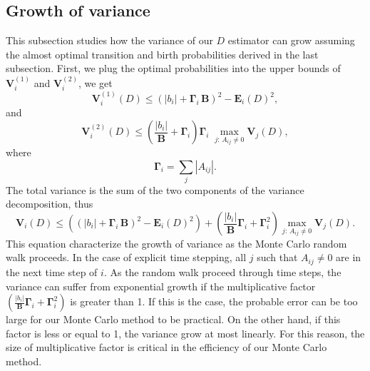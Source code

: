 \documentclass[a4paper,11pt]{article}
\theoremstyle{remark}
\theoremstyle{definition}
\begin{document}
    \subsection{Growth of variance}
        This subsection studies how the variance of our $D$ estimator can
        grow assuming the almost optimal transition and birth probabilities
        derived in the last subsection.  First, we plug the optimal
        probabilities into the upper bounds of $\mathbf{V}_i^{(1)}$ and
        $\mathbf{V}_i^{(2)}$, we get
        \[ \mathbf{V}_i^{(1)}(D)
            \le \left(|b_i| + \mathbf{\Gamma}_i\, \mathbf{B} \right)^2
                - \mathbf{E}_i(D)^2,
        \]
        and
        \[ \mathbf{V}_i^{(2)}(D)
            \le \left( \frac{|b_i|}{\mathbf{B}} + \mathbf{\Gamma}_i \right)
                \mathbf{\Gamma}_i\; \max_{j:\,A_{ij}\ne0} \mathbf{V}_j(D),
        \]
        where
        \[ \mathbf{\Gamma}_i = \sum_j |A_{ij}|.
        \]
        The total variance is the sum of the two components of the variance
        decomposition, thus
        \begin{equation} \label{vargrowth}
            \mathbf{V}_i(D)
            \le \left((|b_i| + \mathbf{\Gamma}_i\, \mathbf{B} )^2
                - \mathbf{E}_i(D)^2\right)
              + \left( \frac{|b_i|}
                {\mathbf{B}} \mathbf{\Gamma}_i + \mathbf{\Gamma}_i^2 \right)
                \max_{j:\,A_{ij}\ne0} \mathbf{V}_j(D).
        \end{equation}
        This equation characterize the growth of variance as the Monte Carlo
        random walk proceeds.  In the case of explicit time stepping, all
        $j$ such that $A_{ij}\ne 0$ are in the next time step of $i$.  As
        the random walk proceed through time steps, the variance can suffer
        from exponential growth if the multiplicative factor
        $\left( \frac{|b_i|} {\mathbf{B}} \mathbf{\Gamma}_i
        + \mathbf{\Gamma}_i^2 \right)$ is greater than 1.  If this is the
        case, the probable error can be too large for our Monte Carlo method
        to be practical.  On the other hand, if this factor is less or equal
        to 1, the variance grow at most linearly.  For this reason, the size
        of multiplicative factor is critical in the efficiency of our Monte
        Carlo method.
\end{document}
